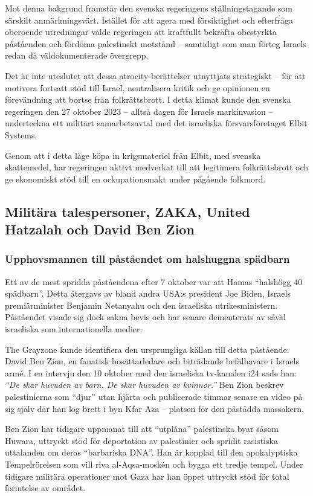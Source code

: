 Mot denna bakgrund framstår den svenska regeringens ställningstagande som särskilt anmärkningsvärt. Istället för att agera med försiktighet och efterfråga oberoende utredningar valde regeringen att kraftfullt bekräfta obestyrkta påståenden och fördöma palestinskt motstånd – samtidigt som man förteg Israels redan då väldokumenterade övergrepp.

Det är inte uteslutet att dessa atrocity-berättelser utnyttjats strategiskt – för att motivera fortsatt stöd till Israel, neutralisera kritik och ge opinionen en förevändning att bortse från folkrättsbrott. I detta klimat kunde den svenska regeringen den 27 oktober 2023 – alltså dagen för Israels markinvasion – underteckna ett militärt samarbetsavtal med det israeliska försvarsföretaget Elbit Systems.

Genom att i detta läge köpa in krigsmateriel från Elbit, med svenska skattemedel, har regeringen aktivt medverkat till att legitimera folkrättsbrott och ge ekonomiskt stöd till en ockupationsmakt under pågående folkmord.

\subsection{Militära talespersoner, ZAKA, United Hatzalah och David Ben Zion}

\subsubsection*{Upphovsmannen till påståendet om halshuggna spädbarn}


Ett av de mest spridda påståendena efter 7 oktober var att Hamas “halshögg 40 spädbarn”. Detta återgavs av bland andra USA:s president Joe Biden, Israels premiärminister Benjamin Netanyahu och den israeliska utrikesministern. Påståendet visade sig dock sakna bevis och har senare dementerats av såväl israeliska som internationella medier.

The Grayzone kunde identifiera den ursprungliga källan till detta påstående: David Ben Zion, en fanatisk bosättarledare och biträdande befälhavare i Israels armé. I en intervju den 10 oktober med den israeliska tv-kanalen i24 sade han: \textit{“De skar huvuden av barn. De skar huvuden av kvinnor.”} Ben Zion beskrev palestinierna som “djur” utan hjärta och publicerade timmar senare en video på sig själv där han log brett i byn Kfar Aza – platsen för den påstådda massakern. 

Ben Zion har tidigare uppmanat till att “utplåna” palestinska byar såsom Huwara, uttryckt stöd för deportation av palestinier och spridit rasistiska uttalanden om deras “barbariska DNA”. Han är kopplad till den apokalyptiska Tempelrörelsen som vill riva al-Aqsa-moskén och bygga ett tredje tempel. Under tidigare militära operationer mot Gaza har han öppet uttryckt stöd för total förintelse av området.

